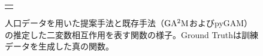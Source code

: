 \begin{figure}[h]
\begin{tabular}{c}
\begin{minipage}{0.24\hsize}
        \end{minipage}
    \end{tabular}
    \caption{人口データを用いた提案手法と既存手法（$\rm GA^2M$およびpyGAM）の推定した二変数相互作用を表す関数の様子。Ground Truthは訓練データを生成した真の関数。}
\label{fig:heatmap-comparison-synthetic-data-2}
\end{figure}
